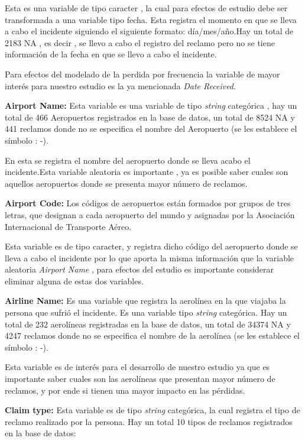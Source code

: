 \documentclass[
  letterpaper,
  onepage,
  openany]{scrreprt}
\begin{document}
Esta es una variable de tipo caracter , la cual para efectos de estudio
debe ser transformada a una variable tipo fecha. Esta registra el
momento en que se lleva a cabo el incidente siguiendo el siguiente
formato: día/mes/año.Hay un total de 2183 NA , es decir , se llevo a
cabo el registro del reclamo pero no se tiene información de la fecha en
que se llevo a cabo el incidente.

Para efectos del modelado de la perdida por frecuencia la variable de
mayor interés para nuestro estudio es la ya mencionada \emph{Date
Received}.

\textbf{Airport Name:} Esta variable es una variable de tipo
\emph{string} categórica , hay un total de 466 Aeropuertos registrados
en la base de datos, un total de 8524 NA y 441 reclamos donde no se
especifica el nombre del Aeropuerto (se les establece el símbolo : -).

En esta se registra el nombre del aeropuerto donde se lleva acabo el
incidente.Esta variable aleatoria es importante , ya es posible saber
cuales son aquellos aeropuertos donde se presenta mayor número de
reclamos.

\textbf{Airport Code:} Los códigos de aeropuertos están formados por
grupos de tres letras, que designan a cada aeropuerto del mundo y
asignadas por la Asociación Internacional de Transporte Aéreo.

Esta variable es de tipo caracter, y registra dicho código del
aeropuerto donde se lleva a cabo el incidente por lo que aporta la misma
información que la variable aleatoria \emph{Airport Name} , para efectos
del estudio es importante considerar eliminar alguna de estas dos
variables.

\textbf{Airline Name:} Es una variable que registra la aerolínea en la
que viajaba la persona que sufrió el incidente. Es una variable tipo
\emph{string} categórica. Hay un total de 232 aerolíneas registradas en
la base de datos, un total de 34374 NA y 4247 reclamos donde no se
especifica el nombre de la aerolínea (se les establece el símbolo : -).

Esta variable es de interés para el desarrollo de nuestro estudio ya que
es importante saber cuales son las aerolíneas que presentan mayor número
de reclamos, y por ende si tienen una mayor impacto en las pérdidas.

\textbf{Claim type:} Esta variable es de tipo \emph{string} categórica,
la cual registra el tipo de reclamo realizado por la persona. Hay un
total 10 tipos de reclamos registrados en la base de datos:
\end{document}
